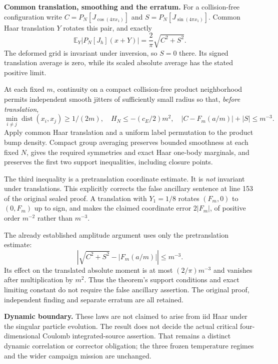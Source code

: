 \documentclass[11pt]{article}
\newcommand{\E}{\mathbb E}
\begin{document}
\newpage
\noindent\textbf{Common translation, smoothing and the erratum.}
For a collision-free configuration write $C=P_N[J_{\cos(4\pi x_1)}]$ and $S=P_N[J_{\sin(4\pi x_1)}]$. Common Haar translation $Y$ rotates this pair, and exactly
\[
 \E_Y|P_N[J_h](x+Y)|=\frac2\pi\sqrt{C^2+S^2}.
\]
The deformed grid is invariant under inversion, so $S=0$ there. Its signed translation average is zero, while its scaled absolute average has the stated positive limit.

At each fixed $m$, continuity on a compact collision-free product neighborhood permits independent smooth jitters of sufficiently small radius so that, \emph{before translation},
\[
 \min_{i\ne j}\operatorname{dist}(x_i,x_j)\ge1/(2m),\quad
 H_N\le-(c_E/2)m^2,\quad |C-F_m(a/m)|+|S|\le m^{-3}.
\]
Apply common Haar translation and a uniform label permutation to the product bump density. Compact group averaging preserves bounded smoothness at each fixed $N$, gives the required symmetries and exact Haar one-body marginals, and preserves the first two support inequalities, including closure points.

The third inequality is a pretranslation coordinate estimate. It is \emph{not} invariant under translations. This explicitly corrects the false ancillary sentence at line 153 of the original sealed proof. A translation with $Y_1=1/8$ rotates $(F_m,0)$ to $(0,F_m)$ up to sign, and makes the claimed coordinate error $2|F_m|$, of positive order $m^{-2}$ rather than $m^{-3}$.

The already established amplitude argument uses only the pretranslation estimate:
\[
 \left|\sqrt{C^2+S^2}-|F_m(a/m)|\right|\le m^{-3}.
\]
Its effect on the translated absolute moment is at most $(2/\pi)m^{-3}$ and vanishes after multiplication by $m^2$. Thus the theorem's support conditions and exact limiting constant do not require the false ancillary assertion. The original proof, independent finding and separate erratum are all retained.

\noindent\textbf{Dynamic boundary.}
These laws are not claimed to arise from iid Haar under the singular particle evolution. The result does not decide the actual critical four-dimensional Coulomb integrated-source assertion. That remains a distinct dynamic correlation or corrector obligation; the three frozen temperature regimes and the wider campaign mission are unchanged.
\end{document}
